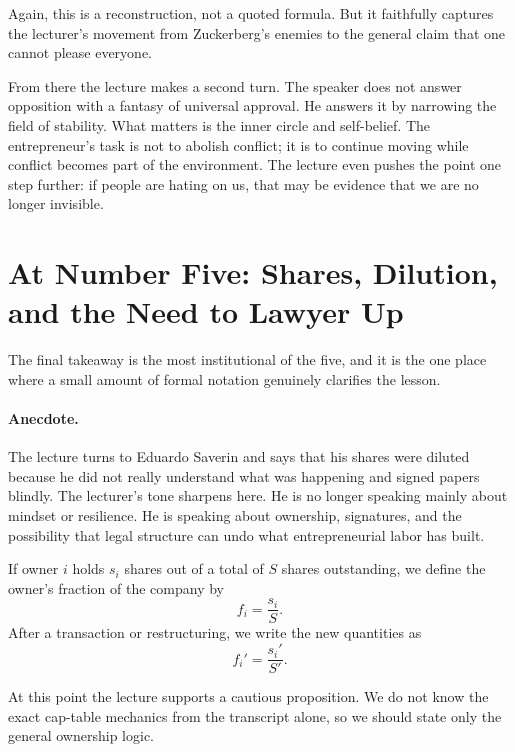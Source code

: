 Again, this is a reconstruction, not a quoted formula. But it faithfully captures the lecturer's movement from Zuckerberg's enemies to the general claim that one cannot please everyone.

From there the lecture makes a second turn. The speaker does not answer opposition with a fantasy of universal approval. He answers it by narrowing the field of stability. What matters is the inner circle and self-belief. The entrepreneur's task is not to abolish conflict; it is to continue moving while conflict becomes part of the environment. The lecture even pushes the point one step further: if people are hating on us, that may be evidence that we are no longer invisible.

\section{At Number Five: Shares, Dilution, and the Need to Lawyer Up}

The final takeaway is the most institutional of the five, and it is the one place where a small amount of formal notation genuinely clarifies the lesson.

\paragraph{Anecdote.}
The lecture turns to Eduardo Saverin and says that his shares were diluted because he did not really understand what was happening and signed papers blindly. The lecturer's tone sharpens here. He is no longer speaking mainly about mindset or resilience. He is speaking about ownership, signatures, and the possibility that legal structure can undo what entrepreneurial labor has built.

\begin{definition}
If owner \(i\) holds \(s_i\) shares out of a total of \(S\) shares outstanding, we define the owner's fraction of the company by
\begin{equation}
f_i = \frac{s_i}{S}.
\end{equation}
After a transaction or restructuring, we write the new quantities as
\begin{equation}
f_i' = \frac{s_i'}{S'}.
\end{equation}
\end{definition}

At this point the lecture supports a cautious proposition. We do not know the exact cap-table mechanics from the transcript alone, so we should state only the general ownership logic.

